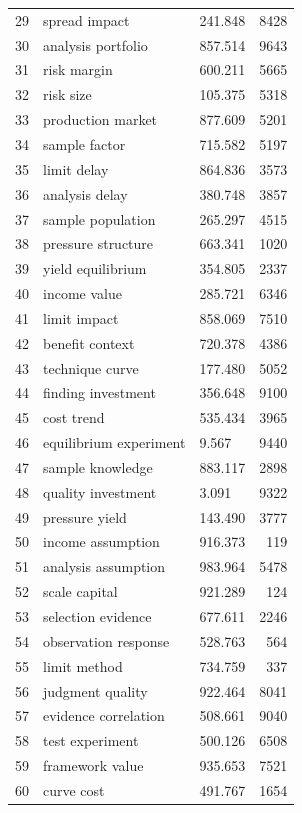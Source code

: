 \documentclass[11pt]{report}
\begin{document}
\begin{longtable}{rllr}
29 & spread impact & 241.848 & 8428 \\
30 & analysis portfolio & 857.514 & 9643 \\
31 & risk margin & 600.211 & 5665 \\
32 & risk size & 105.375 & 5318 \\
33 & production market & 877.609 & 5201 \\
34 & sample factor & 715.582 & 5197 \\
35 & limit delay & 864.836 & 3573 \\
36 & analysis delay & 380.748 & 3857 \\
37 & sample population & 265.297 & 4515 \\
38 & pressure structure & 663.341 & 1020 \\
39 & yield equilibrium & 354.805 & 2337 \\
40 & income value & 285.721 & 6346 \\
41 & limit impact & 858.069 & 7510 \\
42 & benefit context & 720.378 & 4386 \\
43 & technique curve & 177.480 & 5052 \\
44 & finding investment & 356.648 & 9100 \\
45 & cost trend & 535.434 & 3965 \\
46 & equilibrium experiment & 9.567 & 9440 \\
47 & sample knowledge & 883.117 & 2898 \\
48 & quality investment & 3.091 & 9322 \\
49 & pressure yield & 143.490 & 3777 \\
50 & income assumption & 916.373 & 119 \\
51 & analysis assumption & 983.964 & 5478 \\
52 & scale capital & 921.289 & 124 \\
53 & selection evidence & 677.611 & 2246 \\
54 & observation response & 528.763 & 564 \\
55 & limit method & 734.759 & 337 \\
56 & judgment quality & 922.464 & 8041 \\
57 & evidence correlation & 508.661 & 9040 \\
58 & test experiment & 500.126 & 6508 \\
59 & framework value & 935.653 & 7521 \\
60 & curve cost & 491.767 & 1654 \\
\end{longtable}
\end{document}
